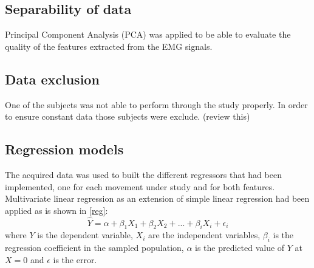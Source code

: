 	\subsection{Separability of data}
Principal Component Analysis (PCA) was applied to be able to evaluate the quality of the features extracted from the EMG signals.
	\subsection{Data exclusion}
	One of the subjects was not able to perform through the study properly. In order to ensure constant data those subjects were exclude.
	(review this)
	\subsection{Regression models}
	The acquired data was used to built the different regressors that had been implemented, one for each movement under study and for both features. Multivariate linear regression as an extension of simple linear regression had been applied as is shown in \ref{reg}:
\begin{equation}
	\hat{Y} = \alpha + \beta_1 X_{1} + \beta_2 X_{2} + ... + \beta_i X_{i} + \epsilon_i
		\label{reg}
\end{equation}
	where $Y$ is the dependent variable, $X_i$ are the independent variables, $\beta_i$ is the regression coefficient in the sampled population, $\alpha$ is the predicted value of $Y$ at $X = 0$ and $\epsilon$ is the error.
	
